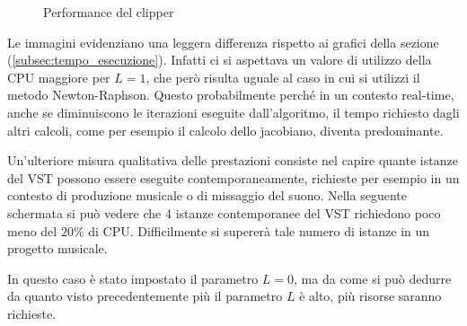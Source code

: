 		\begin{figure}
			\graficospace
			
		\end{figure}
			
		\begin{figure}\ContinuedFloat
			\graficospace
			
			
			\caption{Performance del clipper}
			\label{fig:performance}
		\end{figure}
		\pagebreak
		
		Le immagini evidenziano una leggera differenza rispetto ai grafici della sezione (\ref{subsec:tempo_esecuzione}). Infatti ci si aspettava un valore di utilizzo della CPU maggiore per $L = 1$, che però risulta uguale al caso in cui si utilizzi il metodo Newton-Raphson. Questo probabilmente perché in un contesto real-time, anche se diminuiscono le iterazioni eseguite dall'algoritmo, il tempo richiesto dagli altri calcoli, come per esempio il calcolo dello jacobiano, diventa predominante.
		
		Un'ulteriore misura qualitativa delle prestazioni consiste nel capire quante istanze del VST possono essere eseguite contemporaneamente, richieste per esempio in un contesto di produzione musicale o di missaggio del suono. Nella seguente schermata si può vedere che 4 istanze contemporanee del VST richiedono poco meno del $20\%$ di CPU. Difficilmente si supererà tale numero di istanze in un progetto musicale.
		
		
		In questo caso è stato impostato il parametro $L = 0$, ma da come si può dedurre da quanto visto precedentemente più il parametro $L$ è alto, più risorse saranno richieste.
		
		